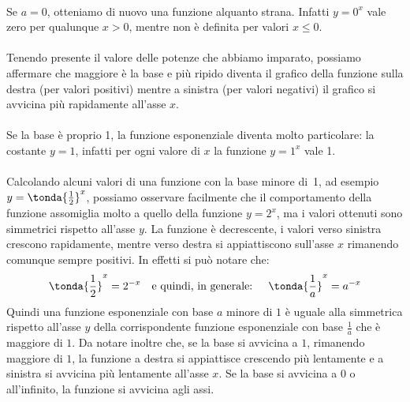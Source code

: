 \paragraph{} Se \(a=0\), otteniamo di nuovo una funzione 
alquanto strana. Infatti \(y = 0^x\) vale
zero per qualunque \(x>0\), mentre non è definita per valori 
\(x \leqslant 0\).
\begin{center}
\end{center}
\paragraph{}
Tenendo presente il valore delle potenze che abbiamo imparato, possiamo 
affermare che maggiore è la base e più ripido diventa il grafico della 
funzione sulla destra (per valori positivi) mentre a sinistra (per valori 
negativi) il grafico si avvicina più rapidamente all'asse \(x\).
\paragraph{}
Se la base è proprio 1, la funzione esponenziale 
diventa molto particolare: la costante \(y = 1\), infatti per ogni 
valore di \(x\) la funzione \(y=1^x\) vale 1.
\paragraph{}
Calcolando alcuni valori di una funzione con la base minore di~1, 
ad esempio \(y=\tonda{\frac{1}{2}}^x\), possiamo osservare facilmente che 
il 
comportamento della funzione assomiglia molto a quello della funzione
\(y=2^x\), ma i valori ottenuti sono simmetrici rispetto all'asse \(y\). 
La funzione è decrescente, i valori verso sinistra crescono rapidamente, 
mentre 
verso destra si appiattiscono sull'asse \(x\) rimanendo comunque sempre 
positivi. In effetti si può notare che:
\[\tonda{\frac{1}{2}}^x = 2^{-x} \quad \text{e quindi, in generale: }\quad 
\tonda{\frac{1}{a}}^x = a^{-x}\]
Quindi una funzione esponenziale con base \(a\) minore di \(1\) è uguale 
alla simmetrica rispetto all'asse \(y\) della
corrispondente funzione esponenziale con base \(\frac{1}{a}\) che è 
maggiore di \(1\). 
Da notare inoltre che, se la base si avvicina
a \(1\), rimanendo maggiore di \(1\), la funzione a destra si 
appiattisce crescendo più lentamente e a sinistra si avvicina più 
lentamente all'asse \(x\). Se la base si avvicina a \(0\) o all'infinito, 
la funzione si avvicina agli assi.

